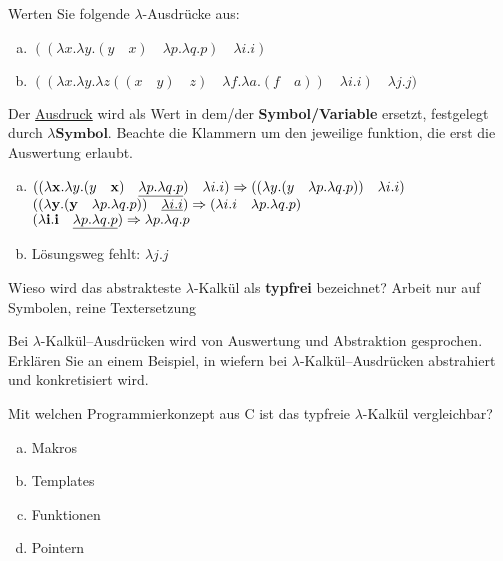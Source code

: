 \begin{card}
	Werten Sie folgende $\lambda$-Ausdrücke aus:
	\begin{enumerate}[a)]
	\item $((\lambda x.\lambda y.(y \quad x) \quad \lambda p.\lambda q.p) \quad \lambda i.i)$
	\item $((\lambda x.\lambda y.\lambda z((x \quad y) \quad z) \quad \lambda f.\lambda a.(f \quad a)) \quad \lambda i.i) \quad\lambda j.j)$
	\end{enumerate}
	\hr
	Der \underline{Ausdruck} wird als Wert in dem/der \textbf{Symbol/Variable} ersetzt, festgelegt durch $\lambda\mathbf{Symbol}$. Beachte die Klammern um den jeweilige funktion, die erst die Auswertung erlaubt.
	\begin{enumerate}[a)]
	\item
	$((\lambda \mathbf{x}.\lambda y.(y \quad \mathbf{x}) \quad \uline{\lambda p.\lambda q.p}) \quad \lambda i.i) 
	\Rightarrow 
	((\lambda y.(y \quad \lambda p.\lambda q.p)) \quad \lambda i.i)$\\
	
	$((\lambda \mathbf{y}.(\mathbf{y} \quad \lambda p.\lambda q.p)) \quad \uline{\lambda i.i})
	\Rightarrow
	(\lambda i.i \quad \lambda p.\lambda q.p)$\\
	
	$(\lambda \mathbf{i}.\mathbf{i} \quad \uline{\lambda p.\lambda q.p})
	\Rightarrow
	\lambda p.\lambda q.p$
	\item Lösungsweg fehlt: $\lambda j.j$
	\end{enumerate}	
\end{card}


\begin{card}
	Wieso wird das abstrakteste $\lambda$-Kalkül als \textbf{typfrei} bezeichnet?
	\hr
	Arbeit nur auf Symbolen, reine Textersetzung
\end{card}

\begin{card}
	Bei $\lambda$-Kalkül–Ausdrücken wird von Auswertung und Abstraktion gesprochen. Erklären Sie an einem Beispiel, in wiefern bei $\lambda$-Kalkül–Ausdrücken abstrahiert und	konkretisiert wird.
	\hr
	
\end{card}

\begin{card}
	Mit welchen Programmierkonzept aus C ist das typfreie $\lambda$-Kalkül vergleichbar? 
	\begin{enumerate}[a)]
	\item Makros
	\item Templates
	\item Funktionen
	\item Pointern
	\end{enumerate}
	\hr
\end{card}

